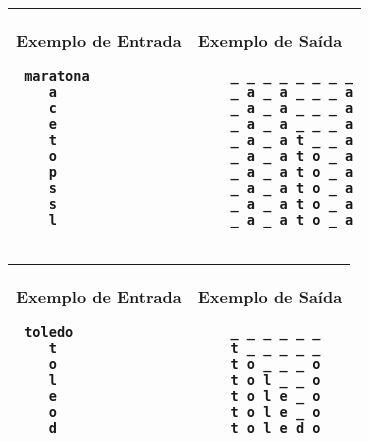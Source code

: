 \newpage
\begin{table}[!h]
\centering
\begin{tabular}{|l|l|}
\hline
\begin{minipage}[t]{3in}
\textbf{Exemplo de Entrada}
\begin{verbatim}
 maratona
    a
    c
    e
    t
    o
    p
    s
    s
    l
\end{verbatim}
\vspace{1mm}
\end{minipage}
&
\begin{minipage}[t]{3in}
\textbf{Exemplo de Saída}
\begin{verbatim}
    _ _ _ _ _ _ _ _
    _ a _ a _ _ _ a
    _ a _ a _ _ _ a
    _ a _ a _ _ _ a
    _ a _ a t _ _ a
    _ a _ a t o _ a
    _ a _ a t o _ a
    _ a _ a t o _ a
    _ a _ a t o _ a
    _ a _ a t o _ a
\end{verbatim}
\vspace{1mm}
\end{minipage} \\
\hline
\end{tabular}
\end{table}


    \begin{table}[!h]
\centering
\begin{tabular}{|l|l|}
\hline
\begin{minipage}[t]{3in}
\textbf{Exemplo de Entrada}
\begin{verbatim}
 toledo
    t
    o
    l
    e
    o
    d
\end{verbatim}
\vspace{1mm}
\end{minipage}
&
\begin{minipage}[t]{3in}
\textbf{Exemplo de Saída}
\begin{verbatim}
    _ _ _ _ _ _ 
    t _ _ _ _ _ 
    t o _ _ _ o
    t o l _ _ o
    t o l e _ o
    t o l e _ o
    t o l e d o
\end{verbatim}
\vspace{1mm}
\end{minipage} \\
\hline
\end{tabular}
\end{table}
